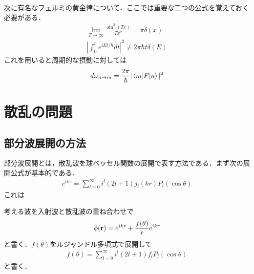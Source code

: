 \documentclass[a4j]{jarticle}
\begin{document}
次に有名なフェルミの黄金律について．ここでは重要な二つの公式を覚えておく必要がある．
\begin{align*}
 \lim_{T\to\infty}\frac{\sin^2(Tx)}{Tx^2}=\pi\delta (x)\\
 |\int_{0}^{t}e^{iEt/\hbar}dt|^2\neq 2\pi \hbar t\delta (E)
\end{align*}
これを用いると周期的な摂動に対しては
\begin{align*}
 d\omega_{n\to m}=\frac{2\pi}{\hbar}|\braket{m|F|n}|^2
\end{align*}


\section{散乱の問題}

\subsection{部分波展開の方法}
部分波展開とは，散乱波を球ベッセル関数の展開で表す方法である．まず次の展開公式が基本的である．
\begin{align*}
 e^{ikz}=\sum_{l=0}^{\infty}i^l(2l+1)j_l(kr)P_l(\cos\theta)
\end{align*}
これは

考える波を入射波と散乱波の重ね合わせで
\begin{align*}
 \phi({\bf r})=e^{ikz}+\frac{f(\theta)}{r}e^{ikr}
\end{align*}
と書く．$f(\theta)$をルジャンドル多項式で展開して
\begin{align*}
 f(\theta)=\sum_{l=0}^{\infty}i^l(2l+1)f_lP_l(\cos\theta)
\end{align*}
と書く．
\end{document}
